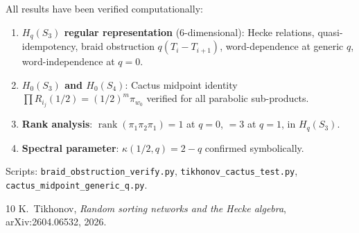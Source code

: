 \documentclass[11pt]{article}
\theoremstyle{definition}
\theoremstyle{remark}
\begin{document}
All results have been verified computationally:

\begin{enumerate}
\item \textbf{$H_q(S_3)$ regular representation} (6-dimensional):
  Hecke relations, quasi-idempotency, braid obstruction $q(T_i - T_{i+1})$,
  word-dependence at generic $q$, word-independence at $q = 0$.

\item \textbf{$H_0(S_3)$ and $H_0(S_4)$}: Cactus midpoint identity
  $\prod R_{i_j}(1/2) = (1/2)^m \pi_{w_0}$ verified for all parabolic
  sub-products.

\item \textbf{Rank analysis}:
  $\operatorname{rank}(\pi_1\pi_2\pi_1) = 1$ at $q = 0$,
  $= 3$ at $q = 1$, in $H_q(S_3)$.

\item \textbf{Spectral parameter}: $\kappa(1/2, q) = 2 - q$ confirmed
  symbolically.
\end{enumerate}

Scripts: \texttt{braid\_obstruction\_verify.py},
\texttt{tikhonov\_cactus\_test.py},
\texttt{cactus\_midpoint\_generic\_q.py}.

\begin{thebibliography}{10}
 K.~Tikhonov, \emph{Random sorting networks and the
  Hecke algebra}, arXiv:2604.06532, 2026.
\end{thebibliography}
\end{document}
